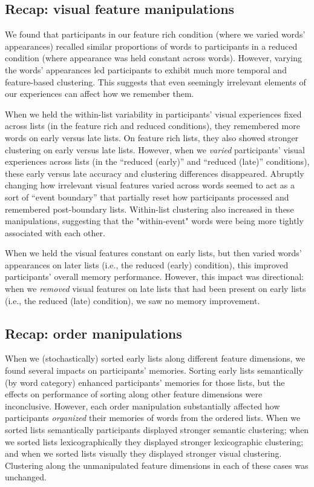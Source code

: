 \documentclass[11pt]{article}
\begin{document}
\subsection*{Recap: visual feature manipulations}

We found that participants in our feature rich condition (where we varied
words' appearances) recalled similar proportions of words to participants in a
reduced condition (where appearance was held constant across words). However,
varying the words' appearances led participants to exhibit much more temporal
and feature-based clustering. This suggests that even seemingly irrelevant
elements of our experiences can affect how we remember them.

When we held the within-list variability in participants' visual experiences
fixed across lists (in the feature rich and reduced conditions), they
remembered more words on early versus late lists. On feature rich lists, they
also showed stronger clustering on early versus late lists. However, when we
\textit{varied} participants' visual experiences across lists (in the ``reduced
(early)'' and ``reduced (late)'' conditions), these early versus late accuracy
and clustering differences disappeared. Abruptly changing how irrelevant visual
features varied across words seemed to act as a sort of ``event boundary'' that
partially reset how participants processed and remembered post-boundary lists.
Within-list clustering also increased in these manipulations, suggesting that
the "within-event" words were being more tightly associated with each other.

When we held the visual features constant on early lists, but then varied
words' appearances on later lists (i.e., the reduced (early) condition), this improved
participants' overall memory performance. However, this impact was directional:
when we \textit{removed} visual features on late lists that had been present on
early lists (i.e., the reduced (late) condition), we saw no memory improvement.

\subsection*{Recap: order manipulations}

When we (stochastically) sorted early lists along different feature dimensions,
we found several impacts on participants' memories. Sorting early lists
semantically (by word category) enhanced participants' memories for those
lists, but the effects on performance of sorting along other feature dimensions
were inconclusive. However, each order manipulation substantially affected how
participants \textit{organized} their memories of words from the ordered lists.
When we sorted lists semantically participants displayed stronger semantic
clustering; when we sorted lists lexicographically they displayed stronger
lexicographic clustering; and when we sorted lists visually they displayed
stronger visual clustering. Clustering along the unmanipulated feature
dimensions in each of these cases was unchanged.
\end{document}
